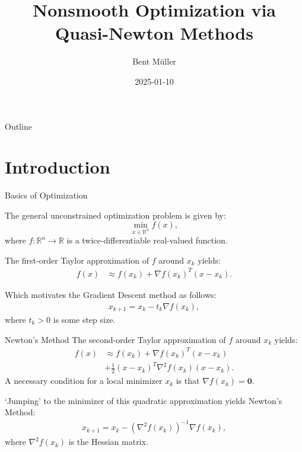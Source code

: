 \documentclass{beamer}
\title{Nonsmooth Optimization via Quasi-Newton Methods}
\author{Bent M\"uller}
\date{2025-01-10}
\begin{document}
\begin{frame}
    \titlepage
\end{frame}

\begin{frame}{Outline}
    \tableofcontents
\end{frame}

\section{Introduction}
\begin{frame}{Basics of Optimization}

     {
        The general unconstrained optimization problem
        is given by:
        \begin{equation*}
            \min_{x \in \mathbb{R}^n} f(x),
        \end{equation*}
        where $f: \mathbb{R}^n \to \mathbb{R}$ is a
        twice-differentiable real-valued function.
    }

     {
        The first-order Taylor approximation
        of $f$ around $x_k$ yields:
        \begin{align*}
            f(x) & \approx f(x_k) + \nabla f(x_k)^T (x - x_k).
        \end{align*}
    }

     {
        Which motivates the Gradient Descent method as follows:
        \begin{align*}
            x_{k+ 1} = x_k - t_k \nabla f(x_k),
        \end{align*}
        where $t_k > 0$ is some step size.
    }
\end{frame}

\begin{frame}{Newton's Method}
     {
        The second-order Taylor approximation of $f$ around $x_k$ yields:
        \begin{align*}
            f(x) & \approx f(x_k) + \nabla f(x_k)^T (x - x_k)           \\
                 & + \frac{1}{2} (x - x_k)^T \nabla^2 f(x_k) (x - x_k).
        \end{align*}
        A necessary condition for a local minimizer $x_k$
        is that $\nabla f(x_k) = \mathbf{0}$.
    }

     {
        \vspace{0.5em}
        `Jumping' to the minimizer of this quadratic
        approximation yields Newton's Method:
        \begin{align*}
            x_{k+1} = x_k - (\nabla^2 f(x_k))^{-1} \nabla f(x_k),
        \end{align*}
        where $\nabla^2 f(x_k)$ is the Hessian matrix.
    }
\end{frame}
\end{document}
